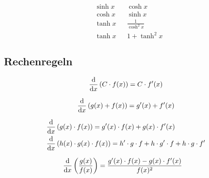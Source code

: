 \begin{boxleft}
\end{boxleft}\begin{boxrightshaded}
 \begin{align} 
  &\sinh x& &\cosh x\\
  &\cosh x& &\sinh x\\
  &\tanh x& &\frac{1}{\cosh^2 x}\\
  &\tanh x& &1+\tanh^2 x
\end{align}\end{boxrightshaded}
          
\subsection{Rechenregeln}

\begin{boxleft}
\end{boxleft}\begin{boxrightshaded}
 \begin{align} 
\frac{\mathop{}\!\mathrm{d} }{\mathop{}\!\mathrm{d} x}\left(C\cdot f(x)\right)=C\cdot f'(x)
 \end{align}\end{boxrightshaded}

\begin{boxleft}
\end{boxleft}\begin{boxrightshaded}
 \begin{align} 
\frac{\mathop{}\!\mathrm{d} }{\mathop{}\!\mathrm{d} x}\left(g(x) + f(x)\right)=g'(x)+f'(x)
 \end{align}\end{boxrightshaded}

\begin{boxleft}
\end{boxleft}\begin{boxrightshaded}
 \begin{align} 
\frac{\mathop{}\!\mathrm{d} }{\mathop{}\!\mathrm{d} x}&\left(g(x)\cdot f(x)\right)=g'(x)\cdot f(x)+g(x)\cdot f'(x)\\
\frac{\mathop{}\!\mathrm{d} }{\mathop{}\!\mathrm{d} x}&\left(h(x)\cdot g(x)\cdot f(x)\right)=h'\cdot g\cdot f+h\cdot g'\cdot f+h\cdot g\cdot f'
 \end{align}\end{boxrightshaded}
            
\begin{boxleft}
\end{boxleft}\begin{boxrightshaded}
 \begin{align} 
\frac{\mathop{}\!\mathrm{d} }{\mathop{}\!\mathrm{d} x}\left(\frac{g(x)}{f(x)}\right)&=\frac{g'(x)\cdot f(x)-g(x)\cdot f'(x)}{f(x)^2}
 \end{align}\end{boxrightshaded}
            
